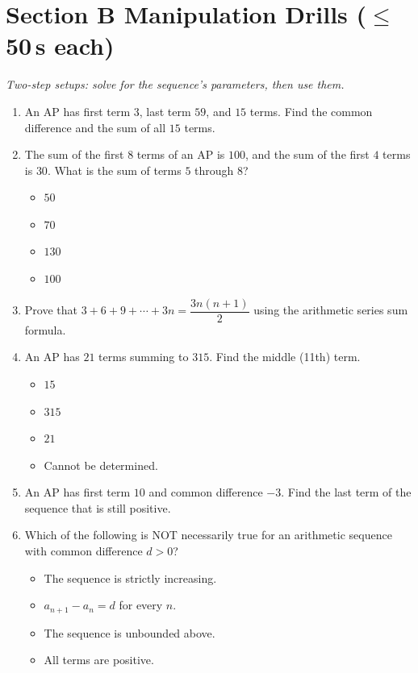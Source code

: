\documentclass[11pt,a4paper]{article}
\begin{document}
\section*{Section B \quad Manipulation Drills \hfill{\normalfont\small($\leq$50\,s each)}}

\noindent\textit{Two-step setups: solve for the sequence's parameters, then use them.}

\begin{enumerate}

\item An AP has first term $3$, last term $59$, and $15$ terms. Find the common difference and the sum of all $15$ terms.

\item The sum of the first $8$ terms of an AP is $100$, and the sum of the first $4$ terms is $30$. What is the sum of terms $5$ through $8$?
\begin{itemize}
\item[A)] $50$
\item[B)] $70$
\item[C)] $130$
\item[D)] $100$
\end{itemize}

\item Prove that $3+6+9+\cdots+3n = \dfrac{3n(n+1)}{2}$ using the arithmetic series sum formula.

\item An AP has $21$ terms summing to $315$. Find the middle (11th) term.
\begin{itemize}
\item[A)] $15$
\item[B)] $315$
\item[C)] $21$
\item[D)] Cannot be determined.
\end{itemize}

\item An AP has first term $10$ and common difference $-3$. Find the last term of the sequence that is still positive.

\item Which of the following is NOT necessarily true for an arithmetic sequence with common difference $d>0$?
\begin{itemize}
\item[A)] The sequence is strictly increasing.
\item[B)] $a_{n+1}-a_n=d$ for every $n$.
\item[C)] The sequence is unbounded above.
\item[D)] All terms are positive.
\end{itemize}


\end{enumerate}
\end{document}
